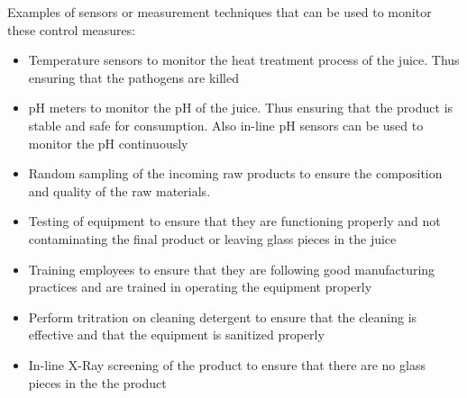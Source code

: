 \vspace{1\baselineskip}

Examples of sensors or measurement techniques that can be used to monitor these control measures:
\begin{itemize}
    \item Temperature sensors to monitor the heat treatment process of the juice. Thus ensuring that the pathogens are killed
    \item pH meters to monitor the pH of the juice. Thus ensuring that the product is stable and safe for consumption. Also in-line pH sensors can be used to monitor the pH continuously
    \item Random sampling of the incoming raw products to ensure the composition and quality of the raw materials. 
    \item Testing of equipment to ensure that they are functioning properly and not contaminating the final product or leaving glass pieces in the juice
    \item Training employees to ensure that they are following good manufacturing practices and are trained in operating the equipment properly
    \item Perform tritration on cleaning detergent to ensure that the cleaning is effective and that the equipment is sanitized properly
    \item In-line X-Ray screening of the product to ensure that there are no glass pieces in the the product
\end{itemize}


